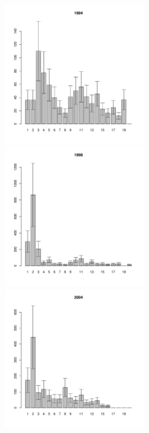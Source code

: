 \begin{figure}[h]
\begin{multicols}{3}
\hfill
\includegraphics[width=60mm]{../White_Sea/Luvenga_II_razrez/zostera_zone_1994_.pdf}
\hfill
\includegraphics[width=60mm]{../White_Sea/Luvenga_II_razrez/zostera_zone_1998_.pdf}
\hfill
\includegraphics[width=60mm]{../White_Sea/Luvenga_II_razrez/zostera_zone_2004_.pdf}
\end{multicols}



\end{figure}
